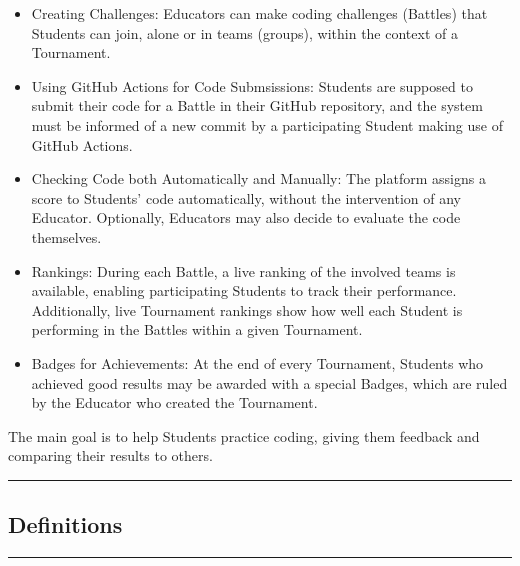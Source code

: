 \documentclass{Configuration_Files/Template}
\begin{document}
\begin{itemize}
\item \textcolor{bluepoli}{Creating Challenges:} Educators can make coding challenges (Battles) that Students can join, alone or in teams (groups), within the context of a Tournament.
\item \textcolor{bluepoli}{Using GitHub Actions for Code Submsissions:} Students are supposed to submit their code for a Battle in their GitHub repository, and the system must be informed of a new commit by a participating Student making use of GitHub Actions.
\item \textcolor{bluepoli}{Checking Code both Automatically and Manually:} The platform assigns a score to Students' code automatically, without the intervention of any Educator. Optionally, Educators may also decide to evaluate the code themselves.
\item \textcolor{bluepoli}{Rankings:} During each Battle, a live ranking of the involved teams is available, enabling participating Students to track their performance. Additionally, live Tournament rankings show how well each Student is performing in the Battles within a given Tournament.
\item \textcolor{bluepoli}{Badges for Achievements:} At the end of every Tournament, Students who achieved good results may be awarded with a special Badges, which are ruled by the Educator who created the Tournament.
\end{itemize}

The main goal is to help Students practice coding, giving them feedback and comparing their results to others.

{\color{bluepoli}\rule{\linewidth}{0.1pt}}

\subsection{Definitions}

{\color{bluepoli}\rule{\linewidth}{0.1pt}}
\end{document}
